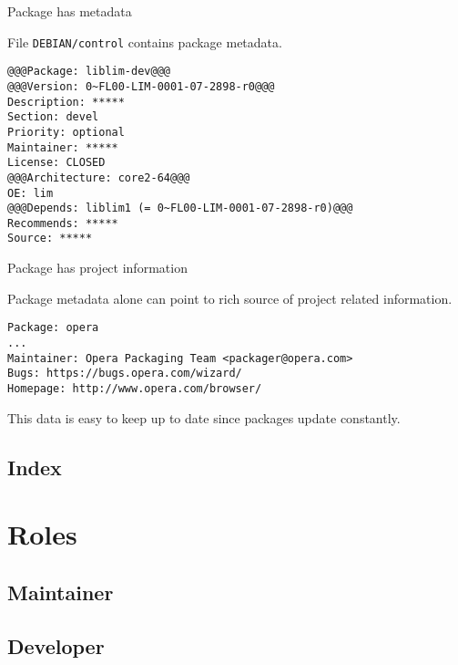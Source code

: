 \documentclass{beamer}
\begin{document}
\begin{frame}[fragile]{Package has metadata}
    \begin{block}{}
        File \verb|DEBIAN/control| contains package metadata.
    \end{block}
\begin{lstlisting}[style=Console]
@@@Package: liblim-dev@@@
@@@Version: 0~FL00-LIM-0001-07-2898-r0@@@
Description: *****
Section: devel
Priority: optional
Maintainer: *****
License: CLOSED
@@@Architecture: core2-64@@@
OE: lim
@@@Depends: liblim1 (= 0~FL00-LIM-0001-07-2898-r0)@@@
Recommends: *****
Source: *****
\end{lstlisting}
\end{frame}

\begin{frame}[fragile]{Package has project information}
    \begin{block}{}
        Package metadata alone can point to
        rich source of project related information.
    \end{block}
\begin{lstlisting}[style=Console]
Package: opera
...
Maintainer: Opera Packaging Team <packager@opera.com>
Bugs: https://bugs.opera.com/wizard/
Homepage: http://www.opera.com/browser/
\end{lstlisting}
    \begin{block}{}
        This data is easy to keep up to date since
        packages update constantly.
    \end{block}
\end{frame}

\subsection{Index}

\begin{frame}
\end{frame}

\section{Roles}

\subsection{Maintainer}

\begin{frame}
\end{frame}

\subsection{Developer}

\begin{frame}
\end{frame}
\end{document}
